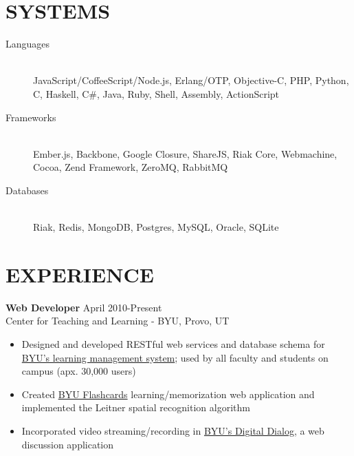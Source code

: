 \documentclass[margin]{res}
\begin{document}

  \address{\bf  377 N 750 E\\Provo, UT 84606\\(801) 803-8577}
  \address{bytheway.cameron@gmail.com\\
           LinkedIn: \href{http://www.linkedin.com/pub/cameron-bytheway/36/a68/993}{Cameron Bytheway}\\
           Github: \href{http://github.com/CamShaft}{CamShaft}}

  \begin{resume}

    \section{SYSTEMS}
      \begin{description}
        \item[Languages] \hfill \\
        JavaScript/CoffeeScript/Node.js, Erlang/OTP, Objective-C, PHP, Python,
        C, Haskell, C\#, Java, Ruby, Shell, Assembly, ActionScript
        \item[Frameworks] \hfill \\
        Ember.js, Backbone, Google Closure, ShareJS, Riak Core, Webmachine,
        Cocoa, Zend Framework, ZeroMQ, RabbitMQ
        \item[Databases] \hfill \\
        Riak, Redis, MongoDB, Postgres, MySQL, Oracle, SQLite
      \end{description}

    \section{EXPERIENCE}
      {\bf Web Developer} \hfill April 2010-Present \\
      Center for Teaching and Learning - BYU, Provo, UT
      \begin{itemize} \itemsep -2pt
        \item Designed and developed RESTful web services and database
         schema for \href{http://lsinfo.byu.edu/}{BYU's learning management system};
         used by all faculty and students on campus (apx. 30,000 users)
        \item Created 
        \href{http://ctl.byu.edu/tools/byu-flashcards}{BYU Flashcards}
        learning/memorization web application and implemented the Leitner
        spatial recognition algorithm
        \item Incorporated video streaming/recording in
        \href{http://ctl.byu.edu/tools/byu-digital-dialog}{BYU's Digital Dialog},
        a web discussion application
      \end{itemize}


\end{resume}
\end{document}
